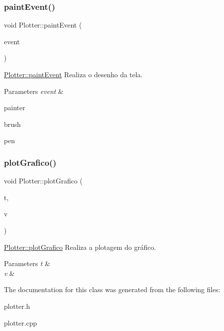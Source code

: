 \subsubsection{\texorpdfstring{paint\+Event()}{paintEvent()}}
{\footnotesize\ttfamily void Plotter\+::paint\+Event (\begin{DoxyParamCaption}\item[{Q\+Paint\+Event $\ast$}]{event }\end{DoxyParamCaption})}



\mbox{\hyperlink{class_plotter_a06477bf987646f000a8982db1352a11d}{Plotter\+::paint\+Event}} Realiza o desenho da tela. 


\begin{DoxyParams}{Parameters}
{\em event} & \\
\hline
\end{DoxyParams}
painter

brush

pen\mbox{\label{class_plotter_a29034483f5519c5bf9dac3ac849e0466}} 
\subsubsection{\texorpdfstring{plot\+Grafico()}{plotGrafico()}}
{\footnotesize\ttfamily void Plotter\+::plot\+Grafico (\begin{DoxyParamCaption}\item[{vector$<$ qint64 $>$ \&}]{t,  }\item[{vector$<$ int $>$ \&}]{v }\end{DoxyParamCaption})}



\mbox{\hyperlink{class_plotter_a29034483f5519c5bf9dac3ac849e0466}{Plotter\+::plot\+Grafico}} Realiza a plotagem do gráfico. 


\begin{DoxyParams}{Parameters}
{\em t} & \\
\hline
{\em v} & \\
\hline
\end{DoxyParams}


The documentation for this class was generated from the following files\+:\begin{DoxyCompactItemize}
\item 
plotter.\+h\item 
plotter.\+cpp\end{DoxyCompactItemize}
